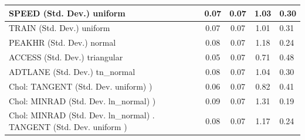\begin{table}
\begin{center}
\begin{tabular}{|l|l|c|c|c|l|}
			\hline
			SPEED (Std. Dev.) uniform &  & 0.07 & 0.07 & 1.03 & 0.30 \\
			\hline
			TRAIN (Std. Dev.) uniform &  & 0.07 & 0.07 & 1.01 & 0.31 \\
			\hline
			PEAKHR (Std. Dev.) normal &  & 0.08 & 0.07 & 1.18 & 0.24 \\
			\hline
			ACCESS (Std. Dev.) triangular &  & 0.05 & 0.07 & 0.71 & 0.48 \\
			\hline
			ADTLANE (Std. Dev.) tn_normal &  & 0.08 & 0.07 & 1.04 & 0.30 \\
			\hline
			 Chol: TANGENT (Std. Dev. uniform) ) &  & 0.06 & 0.07 & 0.82 & 0.41 \\
			\hline
			 Chol: MINRAD (Std. Dev. ln_normal) ) &  & 0.09 & 0.07 & 1.31 & 0.19 \\
			\hline
			 Chol: MINRAD (Std. Dev. ln_normal) . TANGENT (Std. Dev.   uniform ) &  & 0.08 & 0.07 & 1.17 & 0.24 \\
			\hline
		\end{tabular}
	\end{center}
\end{table}